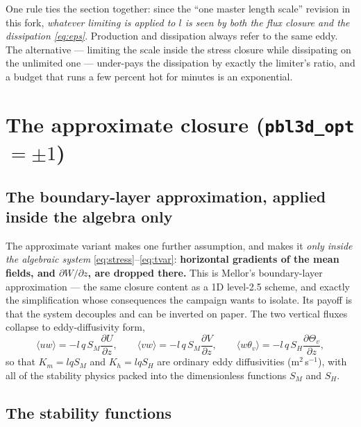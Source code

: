 \documentclass[10pt,a4paper]{article}
\newcommand{\keytag}[1]{\colorbox{keyc}{\textcolor{white}{\sffamily\bfseries\scriptsize K#1}}}
\newcommand{\key}[1]{\marginpar[\raggedleft\keytag{#1}]{\raggedright\keytag{#1}}\ignorespaces}
\newcommand{\kh}[1]{{\color{keyc!80!black}\bfseries #1}}
\newcommand{\avg}[1]{\langle #1 \rangle}
\newcommand{\pd}[2]{\frac{\partial #1}{\partial #2}}
\begin{document}
One rule ties the section together: since the ``one master length scale'' revision in this fork, \emph{whatever limiting is applied to $l$ is seen by both the flux closure and the dissipation \eqref{eq:eps}}. Production and dissipation always refer to the same eddy. The alternative — limiting the scale inside the stress closure while dissipating on the unlimited one — under-pays the dissipation by exactly the limiter's ratio, and a budget that runs a few percent hot for minutes is an exponential.

\section{The approximate closure (\texttt{pbl3d\_opt}$=\pm1$)}
\label{sec:approx}

\subsection{The boundary-layer approximation, applied inside the algebra only}

\key{1}The approximate variant makes one further assumption, and makes it \emph{only inside the algebraic system} \eqref{eq:stress}--\eqref{eq:tvar}: \kh{horizontal gradients of the mean fields, and $\partial W/\partial z$, are dropped there.} This is Mellor's boundary-layer approximation — the same closure content as a 1D level-2.5 scheme, and exactly the simplification whose consequences the campaign wants to isolate. Its payoff is that the system decouples and can be inverted on paper. The two vertical fluxes collapse to eddy-diffusivity form,
\begin{equation}
\avg{uw} = -l\,q\,S_M \pd{U}{z},
\qquad
\avg{vw} = -l\,q\,S_M \pd{V}{z},
\qquad
\avg{w\theta_v} = -l\,q\,S_H \pd{\Theta_v}{z},
\label{eq:kgrad}
\end{equation}
so that $K_m = l q S_M$ and $K_h = l q S_H$ are ordinary eddy diffusivities (m$^2\,$s$^{-1}$), with all of the stability physics packed into the dimensionless functions $S_M$ and $S_H$.

\subsection{The stability functions}
\end{document}
